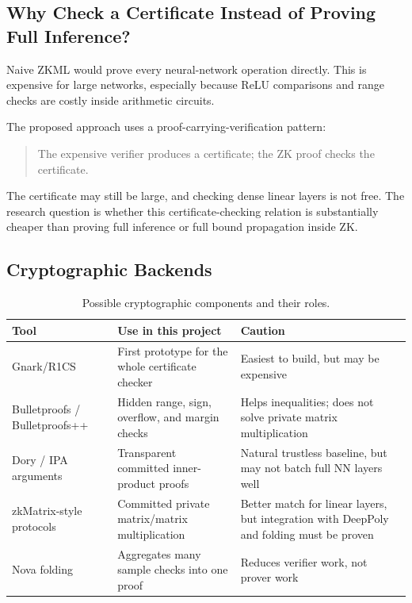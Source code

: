 \documentclass[11pt,a4paper]{article}
\begin{document}
\subsection{Why Check a Certificate Instead of Proving Full Inference?}

Naive ZKML would prove every neural-network operation directly. This is expensive for large networks, especially because ReLU comparisons and range checks are costly inside arithmetic circuits.

The proposed approach uses a proof-carrying-verification pattern:
\begin{quote}
The expensive verifier produces a certificate; the ZK proof checks the certificate.
\end{quote}

The certificate may still be large, and checking dense linear layers is not free. The research question is whether this certificate-checking relation is substantially cheaper than proving full inference or full bound propagation inside ZK.

\subsection{Cryptographic Backends}

\begin{table}[H]
\centering
\begin{tabular}{@{}p{3.3cm}p{4.3cm}p{5.1cm}@{}}
\toprule
\textbf{Tool} & \textbf{Use in this project} & \textbf{Caution} \\
\midrule
Gnark/R1CS & First prototype for the whole certificate checker & Easiest to build, but may be expensive \\
\midrule
Bulletproofs / Bulletproofs++ & Hidden range, sign, overflow, and margin checks & Helps inequalities; does not solve private matrix multiplication \\
\midrule
Dory / IPA arguments & Transparent committed inner-product proofs & Natural trustless baseline, but may not batch full NN layers well \\
\midrule
zkMatrix-style protocols & Committed private matrix/matrix multiplication & Better match for linear layers, but integration with DeepPoly and folding must be proven \\
\midrule
Nova folding & Aggregates many sample checks into one proof & Reduces verifier work, not prover work \\
\bottomrule
\end{tabular}
\caption{Possible cryptographic components and their roles.}
\end{table}
\end{document}
